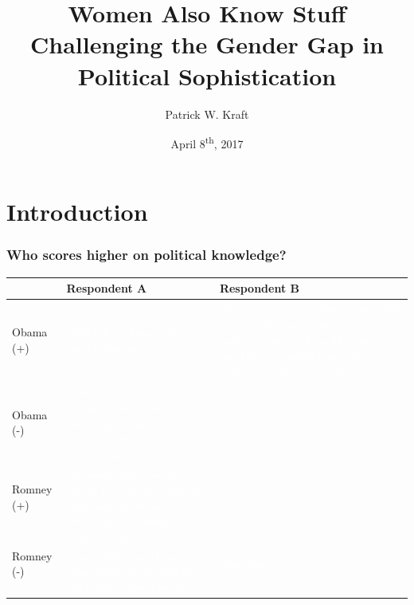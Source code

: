 \documentclass{beamer}
\author{Patrick W. Kraft}
\institute{75\textsuperscript{th} Annual MPSA Conference, Chicago, Il}
\title{Women Also Know Stuff\\{\large Challenging the Gender Gap in Political Sophistication}}
\date{April 8\textsuperscript{th}, 2017}
\begin{document}
\frame{\titlepage}

\section{Introduction}

\begin{frame}%
\frametitle{Who scores higher on political knowledge?}
\begin{table}[ht]\footnotesize\centering
\begin{tabular}{l|p{4.5cm}|p{4.5cm}}
   \toprule
    & \textbf{Respondent A} & \textbf{Respondent B} \\ 
    \midrule
  Obama (+) & \textcolor{white}{I think he is honest, has good intentions.} & \textcolor{white}{He's got a hot wife. Sound mind. Bill Clinton, the best president we ever had, is voting for him. He's not in any type of scandal and is the perfect president for us now.} \\ \hdashline
  Obama (-) & \textcolor{white}{I don't feel he is up for the job, he doesn't really know how to get things accomplished from idea to actual reality.} &  \\ \hdashline
  Romney (+) & \textcolor{white}{He comes across as an honest person and I feel that financially he would be better for the country.} &  \\ \hdashline
  Romney (-) & \textcolor{white}{I am a moderate conservative and there are some things about anti-gay rights that I don't support.} & \textcolor{white}{Everything.} \\
    \bottomrule
 \end{tabular}
\end{table}
\end{frame}
\end{document}
